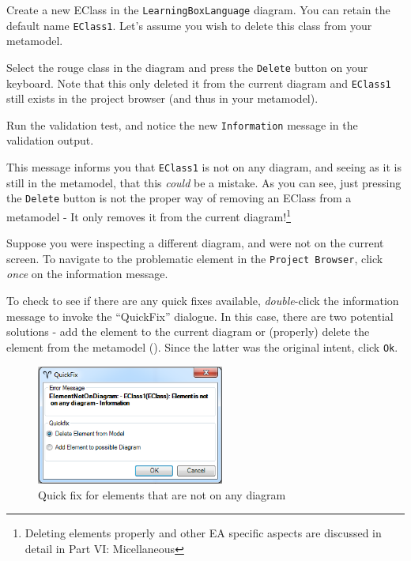 \begin{stepbystep}
\item Create a new EClass in the \texttt{Learning\-Box\-Language} diagram. You can retain the default name \texttt{EClass1}. Let's
assume you wish to delete this class from your metamodel.

\item Select the rouge class in the diagram and press the \texttt{Delete} button on your keyboard. Note that this only deleted it from
the current diagram and \texttt{EClass1} still exists in the project browser (and thus in your metamodel).

\item Run the validation test, and notice the new \texttt{Information} message in the validation output.

This message informs you that \texttt{EClass1} is not on any diagram, and seeing as it is still in the metamodel, that this \emph{could} be a mistake. As you
can see, just pressing the \texttt{Delete} button is not the proper way of removing an EClass from a metamodel - It only removes it from the current
diagram!\footnote{Deleting elements properly and other EA specific aspects are discussed in detail in Part VI: Micellaneous}

\item Suppose you were inspecting a different diagram, and were not on the current screen. To navigate to the problematic element in the
\texttt{Project Browser}, click \emph{once} on the information message.

\item To check to see if there are any quick fixes available, \emph{double}-click the information message to invoke the ``QuickFix''
dialogue. In this case, there are two potential solutions - add the element to the current diagram or (properly) delete the element from the metamodel
(). Since the latter was the original intent, click \texttt{Ok}.

\vspace{0.5cm}

\begin{figure}[htbp]
	\centering
  \includegraphics[width=0.55\textwidth]{../../org.moflon.doc.handbook.02_leitnersLearningBox/2_staticSemantics/5_validation/images/ea_quickFixElements}
	\caption{Quick fix for elements that are not on any diagram}
	\label{ea:quick-fix1}
\end{figure}
\FloatBarrier


\end{stepbystep}
